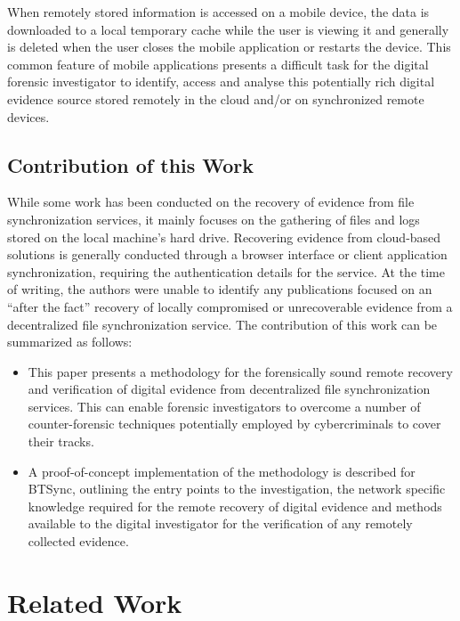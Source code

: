 \documentclass{jdfsl}
\begin{document}
When remotely stored information is accessed on a mobile device, the data is downloaded to a local temporary cache while the user is viewing it and generally is deleted when the user closes the mobile application or restarts the device. This common feature of mobile applications presents a difficult task for the digital forensic investigator to identify, access and analyse this potentially rich digital evidence source stored remotely in the cloud and/or on synchronized remote devices.\\

\subsection{Contribution of this Work}
\label{contribution}
While some work has been conducted on the recovery of evidence from file synchronization services, it mainly focuses on the gathering of files and logs stored on the local machine's hard drive. Recovering evidence from cloud-based solutions is generally conducted through a browser interface or client application synchronization, requiring the authentication details for the service. At the time of writing, the authors were unable to identify any publications focused on an ``after the fact'' recovery of locally compromised or unrecoverable evidence from a decentralized file synchronization service. 
The contribution of this work can be summarized as follows:
\begin{itemize}
\item This paper presents a methodology for the forensically sound remote recovery and verification of digital evidence from decentralized file synchronization services. This can enable forensic investigators to overcome a number of counter-forensic techniques potentially employed by cybercriminals to cover their tracks.

\item A proof-of-concept implementation of the methodology is described for BTSync, outlining the entry points to the investigation, the network specific knowledge required for the remote recovery of digital evidence and methods available to the digital investigator for the verification of any remotely collected evidence.\\
\end{itemize}

\section{Related Work}
\label{related}
\end{document}
